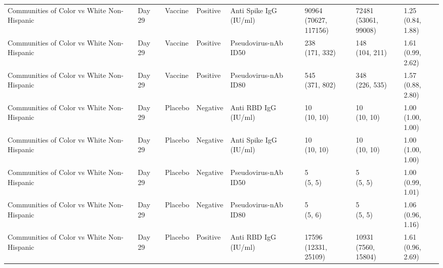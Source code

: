\documentclass[]{book}
\theoremstyle{definition}
\theoremstyle{definition}
\theoremstyle{definition}
\newcommand{\1}{\mathbbm{1}}
\begin{document}
\begin{landscape}
\begin{ThreePartTable}
\begin{longtable}[t]{>{\raggedright\arraybackslash}p{2.7cm}lllllll}
Communities of Color vs White Non-Hispanic & Day 29 & Vaccine & Positive & Anti Spike IgG (IU/ml) & \makecell[l]{90964\\(70627, 117156)} & \makecell[l]{72481\\(53061, 99008)} & \makecell[l]{1.25\\(0.84, 1.88)}\\
\addlinespace
Communities of Color vs White Non-Hispanic & Day 29 & Vaccine & Positive & Pseudovirus-nAb ID50 & \makecell[l]{238\\(171, 332)} & \makecell[l]{148\\(104, 211)} & \makecell[l]{1.61\\(0.99, 2.62)}\\
Communities of Color vs White Non-Hispanic & Day 29 & Vaccine & Positive & Pseudovirus-nAb ID80 & \makecell[l]{545\\(371, 802)} & \makecell[l]{348\\(226, 535)} & \makecell[l]{1.57\\(0.88, 2.80)}\\
Communities of Color vs White Non-Hispanic & Day 29 & Placebo & Negative & Anti RBD IgG (IU/ml) & \makecell[l]{10\\(10, 10)} & \makecell[l]{10\\(10, 10)} & \makecell[l]{1.00\\(1.00, 1.00)}\\
Communities of Color vs White Non-Hispanic & Day 29 & Placebo & Negative & Anti Spike IgG (IU/ml) & \makecell[l]{10\\(10, 10)} & \makecell[l]{10\\(10, 10)} & \makecell[l]{1.00\\(1.00, 1.00)}\\
Communities of Color vs White Non-Hispanic & Day 29 & Placebo & Negative & Pseudovirus-nAb ID50 & \makecell[l]{5\\(5, 5)} & \makecell[l]{5\\(5, 5)} & \makecell[l]{1.00\\(0.99, 1.01)}\\
\addlinespace
Communities of Color vs White Non-Hispanic & Day 29 & Placebo & Negative & Pseudovirus-nAb ID80 & \makecell[l]{5\\(5, 6)} & \makecell[l]{5\\(5, 5)} & \makecell[l]{1.06\\(0.96, 1.16)}\\
Communities of Color vs White Non-Hispanic & Day 29 & Placebo & Positive & Anti RBD IgG (IU/ml) & \makecell[l]{17596\\(12331, 25109)} & \makecell[l]{10931\\(7560, 15804)} & \makecell[l]{1.61\\(0.96, 2.69)}\\

\end{longtable}
\end{ThreePartTable}
\end{landscape}
\end{document}

